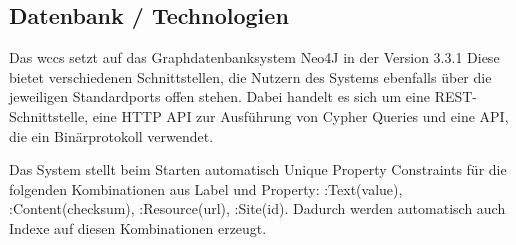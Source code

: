 \subsection{Datenbank / Technologien}
    \label{section:solutionDetailsPersistenceDatabse}
    Das \gls{wccs} setzt auf das Graphdatenbanksystem Neo4J in der Version 3.3.1
    Diese bietet verschiedenen Schnittstellen, die Nutzern des Systems ebenfalls über die jeweiligen Standardports offen stehen.
    Dabei handelt es sich um eine REST-Schnittstelle, %
    eine HTTP API zur Ausführung von Cypher Queries %
    und eine API, die ein Binärprotokoll verwendet. %

    Das System stellt beim Starten automatisch Unique Property Constraints %
    für die folgenden Kombinationen aus Label und Property:
    :Text(value), :Content(checksum), :Resource(url), :Site(id).
    Dadurch werden automatisch auch Indexe auf diesen Kombinationen erzeugt.
